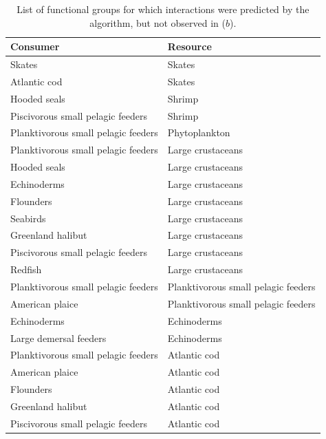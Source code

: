 \begin{singlespace}
\newpage
\begin{table}[h!]
  \caption{List of functional groups for which interactions were predicted by the algorithm, but not observed in \citet{savenkoff2004} ($b$).}
    \centering
    \begin{tabular}{|l|l|}
      \hline
        Consumer               & Resource \\
      \hline    \hline
      Skates                              & Skates    \\
      Atlantic cod                        & Skates    \\
      Hooded seals                        & Shrimp    \\
      Piscivorous small pelagic feeders   & Shrimp    \\
      Planktivorous small pelagic feeders & Phytoplankton \\
      Planktivorous small pelagic feeders & Large crustaceans \\
      Hooded seals                        & Large crustaceans \\
      Echinoderms                         & Large crustaceans \\
      Flounders                           & Large crustaceans \\
      Seabirds                            & Large crustaceans \\
      Greenland halibut                   & Large crustaceans \\
      Piscivorous small pelagic feeders   & Large crustaceans \\
      Redfish                             & Large crustaceans \\
      Planktivorous small pelagic feeders & Planktivorous small pelagic feeders   \\
      American plaice                     & Planktivorous small pelagic feeders   \\
      Echinoderms                         & Echinoderms   \\
      Large demersal feeders              & Echinoderms   \\
      Planktivorous small pelagic feeders & Atlantic cod  \\
      American plaice                     & Atlantic cod  \\
      Flounders                           & Atlantic cod  \\
      Greenland halibut                   & Atlantic cod  \\
      Piscivorous small pelagic feeders   & Atlantic cod  \\

\end{tabular}
\end{table}
\end{singlespace}

